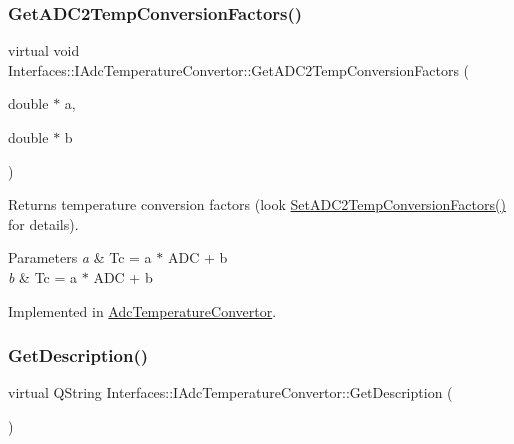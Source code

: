\subsubsection{\texorpdfstring{Get\+A\+D\+C2\+Temp\+Conversion\+Factors()}{GetADC2TempConversionFactors()}}
{\footnotesize\ttfamily virtual void Interfaces\+::\+I\+Adc\+Temperature\+Convertor\+::\+Get\+A\+D\+C2\+Temp\+Conversion\+Factors (\begin{DoxyParamCaption}\item[{double $\ast$}]{a,  }\item[{double $\ast$}]{b }\end{DoxyParamCaption})\hspace{0.3cm}{\ttfamily [pure virtual]}}



Returns temperature conversion factors (look \hyperlink{class_interfaces_1_1_i_adc_temperature_convertor_a3e4c9204b3593bc434a041c7a69c430f}{Set\+A\+D\+C2\+Temp\+Conversion\+Factors()} for details). 


\begin{DoxyParams}{Parameters}
{\em a} & Tc = a $\ast$ A\+DC + b \\
\hline
{\em b} & Tc = a $\ast$ A\+DC + b \\
\hline
\end{DoxyParams}


Implemented in \hyperlink{class_adc_temperature_convertor_aeab56811467e8019731f1e2867a76671}{Adc\+Temperature\+Convertor}.

\mbox{\label{class_interfaces_1_1_i_adc_temperature_convertor_a2f3b59be793c3ed43e880ef12e9749bc}} 
\subsubsection{\texorpdfstring{Get\+Description()}{GetDescription()}}
{\footnotesize\ttfamily virtual Q\+String Interfaces\+::\+I\+Adc\+Temperature\+Convertor\+::\+Get\+Description (\begin{DoxyParamCaption}{ }\end{DoxyParamCaption})\hspace{0.3cm}{\ttfamily [pure virtual]}}



